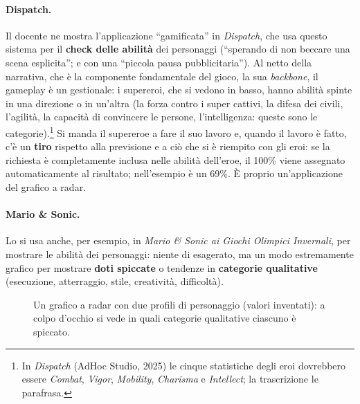 \paragraph{Dispatch.} Il docente ne mostra l'applicazione ``gamificata'' in
\emph{Dispatch}, che usa questo sistema per il \textbf{check delle abilità}
dei personaggi (``sperando di non beccare una scena esplicita''; e con una
``piccola pausa pubblicitaria''). Al netto della narrativa, che è la
componente fondamentale del gioco, la sua \emph{backbone}, il gameplay è un
gestionale: i supereroi, che si vedono in basso, hanno abilità spinte in una
direzione o in un'altra (la forza contro i super cattivi, la difesa dei
civili, l'agilità, la capacità di convincere le persone, l'intelligenza:
queste sono le categorie).\footnote{In \emph{Dispatch} (AdHoc Studio, 2025)
le cinque statistiche degli eroi dovrebbero essere \emph{Combat},
\emph{Vigor}, \emph{Mobility}, \emph{Charisma} e \emph{Intellect}; la
trascrizione le parafrasa.} Si manda il supereroe a fare il suo lavoro e,
quando il lavoro è fatto, c'è un \textbf{tiro} rispetto alla previsione e a
ciò che si è riempito con gli eroi: se la richiesta è completamente inclusa
nelle abilità dell'eroe, il 100\% viene assegnato automaticamente al
risultato; nell'esempio è un 69\%. È proprio un'applicazione del grafico a
radar.

\paragraph{Mario \& Sonic.} Lo si usa anche, per esempio, in \emph{Mario \&
Sonic ai Giochi Olimpici Invernali}, per mostrare le abilità dei personaggi:
niente di esagerato, ma un modo estremamente grafico per mostrare
\textbf{doti spiccate} o tendenze in \textbf{categorie qualitative}
(esecuzione, atterraggio, stile, creatività, difficoltà).

\begin{figure}[htbp]
\centering
{}
\caption{Un grafico a radar con due profili di personaggio (valori
inventati): a colpo d'occhio si vede in quali categorie qualitative ciascuno
è spiccato.}
\label{fig:radar}
\end{figure}

